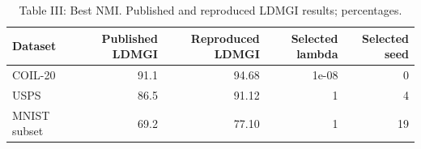 \begin{table}[ht]
\centering
\caption{Table III: Best NMI. Published and reproduced LDMGI results; percentages.}
\begin{tabular}{lrrrr}
\toprule
Dataset & Published LDMGI & Reproduced LDMGI & Selected lambda & Selected seed \\
\midrule
COIL-20 & 91.1 & 94.68 & 1e-08 & 0 \\
USPS & 86.5 & 91.12 & 1 & 4 \\
MNIST subset & 69.2 & 77.10 & 1 & 19 \\
\bottomrule
\end{tabular}
\end{table}
